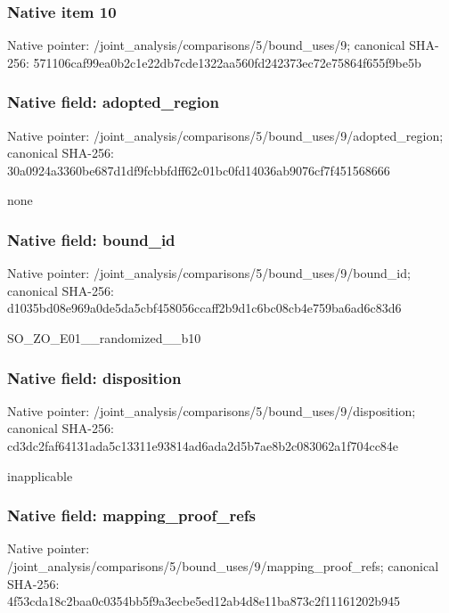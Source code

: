 \documentclass[10pt,a4paper]{article}
\begin{document}
\subsubsection{Native item 10}
Native pointer: /joint\_\allowbreak{}analysis/comparisons/5/bound\_\allowbreak{}uses/9; canonical SHA-256: 571106caf99ea0b2c1e22db7cde1322aa560fd242373ec72e75864f655f9be5b

\subsubsection{Native field: adopted\_\allowbreak{}region}
Native pointer: /joint\_\allowbreak{}analysis/comparisons/5/bound\_\allowbreak{}uses/9/adopted\_\allowbreak{}region; canonical SHA-256: 30a0924a3360be687d1df9fcbbfdff62c01bc0fd14036ab9076cf7f451568666

\begingroup\raggedright\sloppy none\par\endgroup

\subsubsection{Native field: bound\_\allowbreak{}id}
Native pointer: /joint\_\allowbreak{}analysis/comparisons/5/bound\_\allowbreak{}uses/9/bound\_\allowbreak{}id; canonical SHA-256: d1035bd08e969a0de5da5cbf458056ccaff2b9d1c6bc08cb4e759ba6ad6c83d6

\begingroup\raggedright\sloppy SO\_\allowbreak{}ZO\_\allowbreak{}E01\_\allowbreak{}\_\allowbreak{}randomized\_\allowbreak{}\_\allowbreak{}b10\par\endgroup

\subsubsection{Native field: disposition}
Native pointer: /joint\_\allowbreak{}analysis/comparisons/5/bound\_\allowbreak{}uses/9/disposition; canonical SHA-256: cd3dc2faf64131ada5c13311e93814ad6ada2d5b7ae8b2c083062a1f704cc84e

\begingroup\raggedright\sloppy inapplicable\par\endgroup

\subsubsection{Native field: mapping\_\allowbreak{}proof\_\allowbreak{}refs}
Native pointer: /joint\_\allowbreak{}analysis/comparisons/5/bound\_\allowbreak{}uses/9/mapping\_\allowbreak{}proof\_\allowbreak{}refs; canonical SHA-256: 4f53cda18c2baa0c0354bb5f9a3ecbe5ed12ab4d8e11ba873c2f11161202b945
\end{document}
